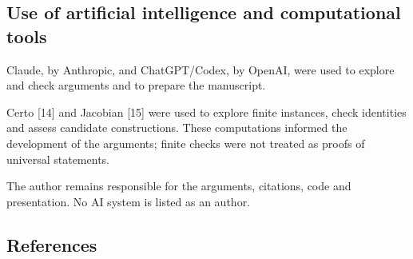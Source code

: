 \documentclass[english,11pt,a4paper]{article}
\begin{document}
\subsection{Use of artificial intelligence and computational tools}\label{use-of-artificial-intelligence-and-computational-tools}

Claude, by Anthropic, and ChatGPT/Codex, by OpenAI, were used to explore and check arguments and to prepare the manuscript.

Certo {[}14{]} and Jacobian {[}15{]} were used to explore finite instances, check identities and assess candidate constructions. These computations informed the development of the arguments; finite checks were not treated as proofs of universal statements.

The author remains responsible for the arguments, citations, code and presentation. No AI system is listed as an author.

\subsection{References}\label{references}
\end{document}
